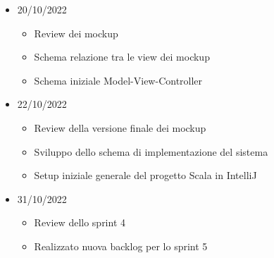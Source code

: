 \begin{itemize}
\begin{itemize}
        \end{itemize}
    \item 20/10/2022
        \begin{itemize}
            \item Review dei mockup
            \item Schema relazione tra le view dei mockup
            \item Schema iniziale Model-View-Controller
        \end{itemize}
    \item 22/10/2022
        \begin{itemize}
            \item Review della versione finale dei mockup
            \item Sviluppo dello schema di implementazione del sistema
            \item Setup iniziale generale del progetto Scala in IntelliJ
        \end{itemize}
    \item 31/10/2022
        \begin{itemize}
            \item Review dello sprint 4
            \item Realizzato nuova backlog per lo sprint 5
        \end{itemize}
\end{itemize}

